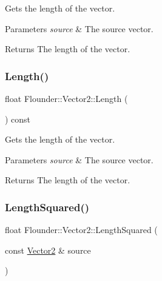 Gets the length of the vector. 


\begin{DoxyParams}{Parameters}
{\em source} & The source vector. \\
\hline
\end{DoxyParams}
\begin{DoxyReturn}{Returns}
The length of the vector. 
\end{DoxyReturn}
\mbox{\label{class_flounder_1_1_vector2_a650930a0b411de5d36e9a11b0488a3e3}} 
\subsubsection{\texorpdfstring{Length()}{Length()}\hspace{0.1cm}{\footnotesize\ttfamily [2/2]}}
{\footnotesize\ttfamily float Flounder\+::\+Vector2\+::\+Length (\begin{DoxyParamCaption}{ }\end{DoxyParamCaption}) const}



Gets the length of the vector. 


\begin{DoxyParams}{Parameters}
{\em source} & The source vector. \\
\hline
\end{DoxyParams}
\begin{DoxyReturn}{Returns}
The length of the vector. 
\end{DoxyReturn}
\mbox{\label{class_flounder_1_1_vector2_a68d558537c1e85769d71f3fd2084880e}} 
\subsubsection{\texorpdfstring{Length\+Squared()}{LengthSquared()}\hspace{0.1cm}{\footnotesize\ttfamily [1/2]}}
{\footnotesize\ttfamily float Flounder\+::\+Vector2\+::\+Length\+Squared (\begin{DoxyParamCaption}\item[{const \hyperlink{class_flounder_1_1_vector2}{Vector2} \&}]{source }\end{DoxyParamCaption})\hspace{0.3cm}{\ttfamily [static]}}



